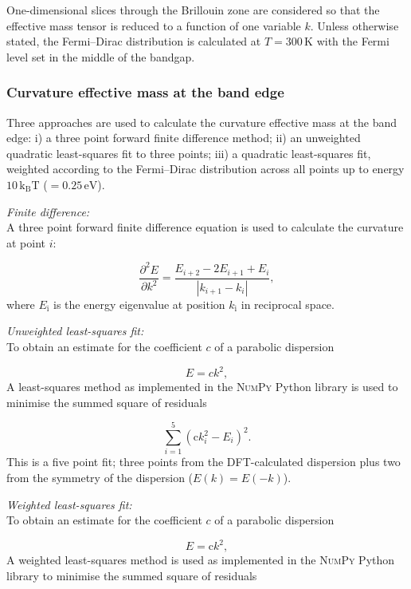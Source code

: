 One-dimensional slices through the Brillouin zone are considered so that the effective mass tensor is reduced to a function of one variable $k$. Unless otherwise stated, the Fermi--Dirac distribution is calculated at $T=300\,\mathrm{K}$ with the Fermi level set in the middle of the bandgap.

\subsubsection{Curvature effective mass at the band edge}

Three approaches are used to calculate the curvature effective mass at the band edge: i) a three point forward finite difference method; ii) an unweighted quadratic least-squares fit\autocite{Vanderwalt2011} to three points; iii) a quadratic least-squares fit, weighted according to the Fermi--Dirac distribution across all points up to energy $10\,\mathrm{k_\mathrm{B}T}$ ($=0.25\,\mathrm{eV}$).

\textit{Finite difference:} \\
A three point forward finite difference equation is used to calculate the curvature at point $i$:

\begin{equation}
\frac{\partial^2E}{\partial k^2} = \frac{E_{i+2} - 2E_{i+1} + E_i}{\left|k_{i+1} - k_i\right|},
\end{equation}
where $E_\mathrm{i}$ is the energy eigenvalue at position $k_\mathrm{i}$ in reciprocal space. 

\textit{Unweighted least-squares fit:}\\
To obtain an estimate for the coefficient $c$ of a parabolic dispersion

\begin{equation}
E = {c}k^2,
\end{equation}
A least-squares method as implemented in the \textsc{NumPy} Python library is used to minimise the summed square of residuals

\begin{equation}
\sum^{5}_{i=1}(\mathrm{c}k_{i}^2 - E_{i})^2.
\end{equation}
This is a five point fit; three points from the DFT-calculated dispersion plus two from the symmetry of the dispersion ($E(k)=E(-k)$).

\textit{Weighted least-squares fit:}\\
To obtain an estimate for the coefficient $c$ of a parabolic dispersion

\begin{equation}
E = \mathrm{c}k^2,
\end{equation}
A weighted least-squares method is used as implemented in the \textsc{NumPy} Python library to minimise the summed square of residuals

